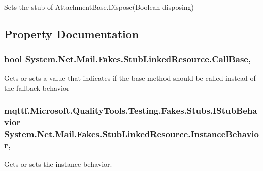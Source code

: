Sets the stub of Attachment\-Base.\-Dispose(\-Boolean disposing)



\subsection{Property Documentation}
\hypertarget{class_system_1_1_net_1_1_mail_1_1_fakes_1_1_stub_linked_resource_aeb0ed903d4552f32b3823c1ee8f1cabb}{
\subsubsection[{Call\-Base}]{\setlength{\rightskip}{0pt plus 5cm}bool System.\-Net.\-Mail.\-Fakes.\-Stub\-Linked\-Resource.\-Call\-Base\hspace{0.3cm}{\ttfamily [get]}, {\ttfamily [set]}}}\label{class_system_1_1_net_1_1_mail_1_1_fakes_1_1_stub_linked_resource_aeb0ed903d4552f32b3823c1ee8f1cabb}


Gets or sets a value that indicates if the base method should be called instead of the fallback behavior

\hypertarget{class_system_1_1_net_1_1_mail_1_1_fakes_1_1_stub_linked_resource_a354d5fbf6c9832b393acfa2c274cf31d}{
\subsubsection[{Instance\-Behavior}]{\setlength{\rightskip}{0pt plus 5cm}mqttf.\-Microsoft.\-Quality\-Tools.\-Testing.\-Fakes.\-Stubs.\-I\-Stub\-Behavior System.\-Net.\-Mail.\-Fakes.\-Stub\-Linked\-Resource.\-Instance\-Behavior\hspace{0.3cm}{\ttfamily [get]}, {\ttfamily [set]}}}\label{class_system_1_1_net_1_1_mail_1_1_fakes_1_1_stub_linked_resource_a354d5fbf6c9832b393acfa2c274cf31d}


Gets or sets the instance behavior.

